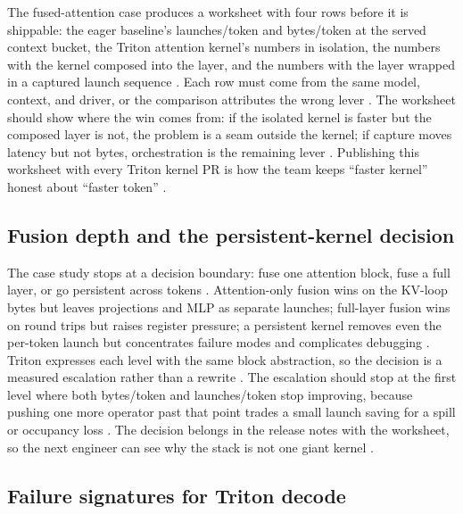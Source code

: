 The fused-attention case produces a worksheet with four rows before it is shippable: the eager baseline's launches/token and bytes/token at the served context bucket, the Triton attention kernel's numbers in isolation, the numbers with the kernel composed into the layer, and the numbers with the layer wrapped in a captured launch sequence \citep{patel2025llminference,taxbreak2026,memoryfloor2026}. Each row must come from the same model, context, and driver, or the comparison attributes the wrong lever \citep{chen2020compilerbasedhardw,patel2025llminference}. The worksheet should show where the win comes from: if the isolated kernel is faster but the composed layer is not, the problem is a seam outside the kernel; if capture moves latency but not bytes, orchestration is the remaining lever \citep{memoryfloor2026,nvidia2024cudagraphs}. Publishing this worksheet with every Triton kernel PR is how the team keeps ``faster kernel'' honest about ``faster token'' \citep{taxbreak2026,memoryfloor2026}.

\subsection{Fusion depth and the persistent-kernel decision}

The case study stops at a decision boundary: fuse one attention block, fuse a full layer, or go persistent across tokens \citep{dao2022flashattention,taxbreak2026}. Attention-only fusion wins on the KV-loop bytes but leaves projections and MLP as separate launches; full-layer fusion wins on round trips but raises register pressure; a persistent kernel removes even the per-token launch but concentrates failure modes and complicates debugging \citep{memoryfloor2026,nvidia2024cudagraphs}. Triton expresses each level with the same block abstraction, so the decision is a measured escalation rather than a rewrite \citep{tillet2019triton,tritonlang2024}. The escalation should stop at the first level where both bytes/token and launches/token stop improving, because pushing one more operator past that point trades a small launch saving for a spill or occupancy loss \citep{memoryfloor2026,nvidia2022hopper}. The decision belongs in the release notes with the worksheet, so the next engineer can see why the stack is not one giant kernel \citep{chen2020compilerbasedhardw,patel2025llminference}.

\subsection{Failure signatures for Triton decode}

